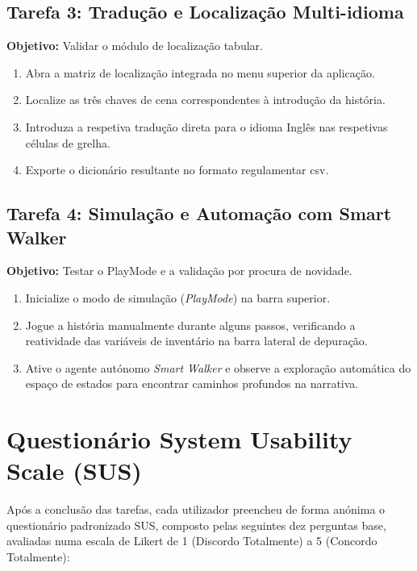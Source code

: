 \subsection*{Tarefa 3: Tradução e Localização Multi-idioma}
\textbf{Objetivo:} Validar o módulo de localização tabular.
\begin{enumerate}
    \item Abra a matriz de localização integrada no menu superior da aplicação.
    \item Localize as três chaves de cena correspondentes à introdução da história.
    \item Introduza a respetiva tradução direta para o idioma Inglês nas respetivas células de grelha.
    \item Exporte o dicionário resultante no formato regulamentar \gls{csv}.
\end{enumerate}

\subsection*{Tarefa 4: Simulação e Automação com Smart Walker}
\textbf{Objetivo:} Testar o PlayMode e a validação por procura de novidade.
\begin{enumerate}
    \item Inicialize o modo de simulação (\textit{PlayMode}) na barra superior.
    \item Jogue a história manualmente durante alguns passos, verificando a reatividade das variáveis de inventário na barra lateral de depuração.
    \item Ative o agente autónomo \textit{Smart Walker} e observe a exploração automática do espaço de estados para encontrar caminhos profundos na narrativa.
\end{enumerate}

\section{Questionário System Usability Scale (SUS)}
Após a conclusão das tarefas, cada utilizador preencheu de forma anónima o questionário padronizado SUS, composto pelas seguintes dez perguntas base, avaliadas numa escala de Likert de 1 (Discordo Totalmente) a 5 (Concordo Totalmente):


